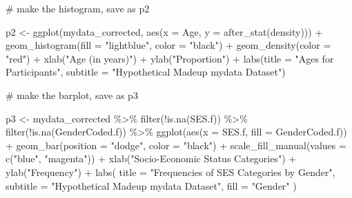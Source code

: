 \documentclass[
  letterpaper,
  DIV=11,
  numbers=noendperiod]{scrartcl}
\newenvironment{Shaded}{\begin{snugshade}}{\end{snugshade}}
\newcommand{\AttributeTok}[1]{\textcolor[rgb]{0.40,0.45,0.13}{#1}}
\newcommand{\CommentTok}[1]{\textcolor[rgb]{0.37,0.37,0.37}{#1}}
\newcommand{\FunctionTok}[1]{\textcolor[rgb]{0.28,0.35,0.67}{#1}}
\newcommand{\NormalTok}[1]{\textcolor[rgb]{0.00,0.23,0.31}{#1}}
\newcommand{\OtherTok}[1]{\textcolor[rgb]{0.00,0.23,0.31}{#1}}
\newcommand{\SpecialCharTok}[1]{\textcolor[rgb]{0.37,0.37,0.37}{#1}}
\newcommand{\StringTok}[1]{\textcolor[rgb]{0.13,0.47,0.30}{#1}}
\begin{document}
\begin{Shaded}
\begin{Highlighting}[]
\CommentTok{\# make the histogram, save as p2}

\NormalTok{p2 }\OtherTok{\textless{}{-}} \FunctionTok{ggplot}\NormalTok{(mydata\_corrected, }
             \FunctionTok{aes}\NormalTok{(}\AttributeTok{x =}\NormalTok{ Age, }
                 \AttributeTok{y =} \FunctionTok{after\_stat}\NormalTok{(density))) }\SpecialCharTok{+}
  \FunctionTok{geom\_histogram}\NormalTok{(}\AttributeTok{fill =} \StringTok{"lightblue"}\NormalTok{, }\AttributeTok{color =} \StringTok{"black"}\NormalTok{) }\SpecialCharTok{+}
  \FunctionTok{geom\_density}\NormalTok{(}\AttributeTok{color =} \StringTok{"red"}\NormalTok{) }\SpecialCharTok{+}
  \FunctionTok{xlab}\NormalTok{(}\StringTok{"Age (in years)"}\NormalTok{) }\SpecialCharTok{+}
  \FunctionTok{ylab}\NormalTok{(}\StringTok{"Proportion"}\NormalTok{) }\SpecialCharTok{+}
  \FunctionTok{labs}\NormalTok{(}\AttributeTok{title =} \StringTok{"Ages for Participants"}\NormalTok{, }
       \AttributeTok{subtitle =} \StringTok{"Hypothetical Madeup mydata Dataset"}\NormalTok{)}
\end{Highlighting}
\end{Shaded}

\begin{Shaded}
\begin{Highlighting}[]
\CommentTok{\# make the barplot, save as p3}

\NormalTok{p3 }\OtherTok{\textless{}{-}}\NormalTok{ mydata\_corrected }\SpecialCharTok{\%\textgreater{}\%}
  \FunctionTok{filter}\NormalTok{(}\SpecialCharTok{!}\FunctionTok{is.na}\NormalTok{(SES.f)) }\SpecialCharTok{\%\textgreater{}\%}
  \FunctionTok{filter}\NormalTok{(}\SpecialCharTok{!}\FunctionTok{is.na}\NormalTok{(GenderCoded.f)) }\SpecialCharTok{\%\textgreater{}\%}
  \FunctionTok{ggplot}\NormalTok{(}\FunctionTok{aes}\NormalTok{(}\AttributeTok{x =}\NormalTok{ SES.f,}
             \AttributeTok{fill =}\NormalTok{ GenderCoded.f)) }\SpecialCharTok{+}
  \FunctionTok{geom\_bar}\NormalTok{(}\AttributeTok{position =} \StringTok{"dodge"}\NormalTok{, }
           \AttributeTok{color =} \StringTok{"black"}\NormalTok{) }\SpecialCharTok{+}
  \FunctionTok{scale\_fill\_manual}\NormalTok{(}\AttributeTok{values =} \FunctionTok{c}\NormalTok{(}\StringTok{"blue"}\NormalTok{, }
                               \StringTok{"magenta"}\NormalTok{)) }\SpecialCharTok{+}
  \FunctionTok{xlab}\NormalTok{(}\StringTok{"Socio{-}Economic Status Categories"}\NormalTok{) }\SpecialCharTok{+}
  \FunctionTok{ylab}\NormalTok{(}\StringTok{"Frequency"}\NormalTok{) }\SpecialCharTok{+}
  \FunctionTok{labs}\NormalTok{(}
    \AttributeTok{title =} \StringTok{"Frequencies of SES Categories by Gender"}\NormalTok{,}
    \AttributeTok{subtitle =} \StringTok{"Hypothetical Madeup mydata Dataset"}\NormalTok{,}
    \AttributeTok{fill =} \StringTok{"Gender"}
\NormalTok{  )}
\end{Highlighting}
\end{Shaded}
\end{document}
